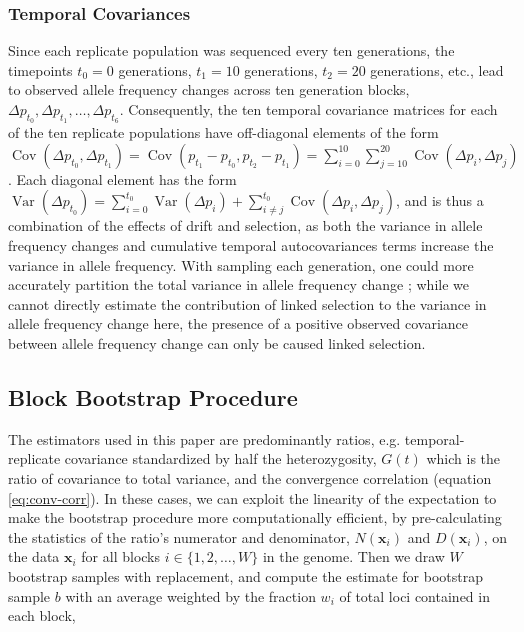 \documentclass[11pt]{article}
\DeclareMathOperator{\var}{Var}
\DeclareMathOperator{\cov}{Cov}
\begin{document}
\subsubsection{\textcite{Barghi2019-qy} Temporal Covariances}
\label{supp:barghi-covs}

Since each replicate population was sequenced every ten generations,
the timepoints $t_0 = 0$ generations, $t_1 = 10$ generations, $t_2 = 20$
generations, etc., lead to observed allele frequency changes across ten
generation blocks, $\Delta p_{t_0}, \Delta p_{t_1}, \ldots, \Delta p_{t_6}$.
Consequently, the ten temporal covariance matrices for each of the ten
replicate populations have off-diagonal elements of the form $\cov(\Delta
p_{t_0}, \Delta p_{t_1}) = \cov(p_{t_1} - p_{t_0}, p_{t_2} - p_{t_1}) =
\sum_{i=0}^{10} \sum_{j=10}^{20} \cov(\Delta p_i, \Delta p_j)$. Each diagonal
element has the form $\var(\Delta p_{t_0}) = \sum_{i=0}^{t_0} \var(\Delta
p_{i}) + \sum_{i \ne j}^{t_0} \cov(\Delta p_{i}, \Delta p_{j})$, and is thus a
combination of the effects of drift and selection, as both the variance in
allele frequency changes and cumulative temporal autocovariances terms increase
the variance in allele frequency. With sampling each generation, one could more
accurately partition the total variance in allele frequency change
\parencite{Buffalo2019-io}; while we cannot directly estimate the contribution
of linked selection to the variance in allele frequency change here, the
presence of a positive observed covariance between allele frequency change can
only be caused linked selection. 

\subsection{Block Bootstrap Procedure}
\label{supp:block-bootstrap}


The estimators used in this paper are predominantly ratios, e.g.
temporal-replicate covariance standardized by half the heterozygosity, $G(t)$
which is the ratio of covariance to total variance, and the convergence
correlation (equation \eqref{eq:conv-corr}). In these cases, we can exploit the
linearity of the expectation to make the bootstrap procedure more
computationally efficient, by pre-calculating the statistics of the ratio's
numerator and denominator, $N(\mathbf{x}_i)$ and $D(\mathbf{x}_i)$, on the data
$\mathbf{x}_i$ for all blocks $i \in \{1, 2, \ldots, W\}$ in the genome. Then
we draw $W$ bootstrap samples with replacement, and compute the estimate for
bootstrap sample $b$ with an average weighted by the fraction $w_i$ of total
loci contained in each block, 
\end{document}
